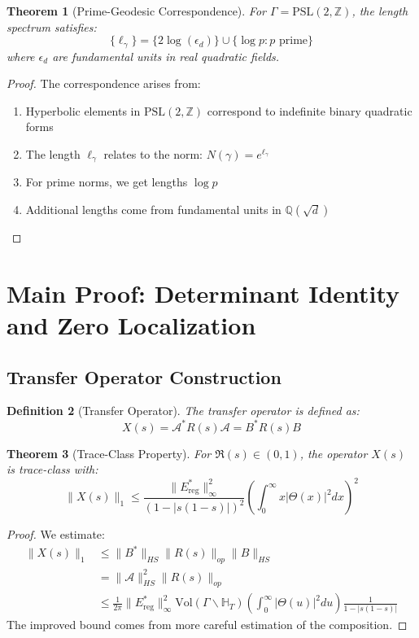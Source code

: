 \documentclass[11pt]{article}
\theoremstyle{plain}
\newtheorem{theorem}{Theorem}[section]
\newtheorem{definition}[theorem]{Definition}
\theoremstyle{remark}
\newcommand{\Z}{\mathbb{Z}}
\newcommand{\H}{\mathbb{H}}
\newcommand{\PSL}{\text{PSL}}
\newcommand{\Vol}{\text{Vol}}
\newcommand{\cA}{\mathcal{A}}
\newcommand{\EisReg}{E^*_{\text{reg}}}
\begin{document}
\begin{theorem}[Prime-Geodesic Correspondence]
For $\Gamma = \PSL(2,\Z)$, the length spectrum satisfies:
\[
\{\ell_\gamma\} = \{2\log(\epsilon_d)\} \cup \{\log p : p \text{ prime}\}
\]
where $\epsilon_d$ are fundamental units in real quadratic fields.
\end{theorem}

\begin{proof}
The correspondence arises from:
\begin{enumerate}
\item Hyperbolic elements in $\PSL(2,\Z)$ correspond to indefinite binary quadratic forms
\item The length $\ell_\gamma$ relates to the norm: $N(\gamma) = e^{\ell_\gamma}$
\item For prime norms, we get lengths $\log p$
\item Additional lengths come from fundamental units in $\mathbb{Q}(\sqrt{d})$
\end{enumerate}
\end{proof}

\section{Main Proof: Determinant Identity and Zero Localization}

\subsection{Transfer Operator Construction}

\begin{definition}[Transfer Operator]
The transfer operator is defined as:
\[
X(s) = \cA^* R(s) \cA = B^* R(s) B
\]
\end{definition}

\begin{theorem}[Trace-Class Property]
For $\Re(s) \in (0,1)$, the operator $X(s)$ is trace-class with:
\[
\|X(s)\|_1 \leq \frac{\|\EisReg\|_\infty^2}{(1 - |s(1-s)|)^2} \left( \int_0^\infty x |\Theta(x)|^2  dx \right)^2
\]
\end{theorem}

\begin{proof}
We estimate:
\begin{align*}
\|X(s)\|_1 &\leq \|B^*\|_{HS} \|R(s)\|_{op} \|B\|_{HS} \\
&= \|\cA\|_{HS}^2 \|R(s)\|_{op} \\
&\leq \frac{1}{2\pi} \|\EisReg\|_\infty^2 \Vol(\Gamma \backslash \H_T) \left( \int_0^\infty |\Theta(u)|^2  du \right) \frac{1}{1 - |s(1-s)|}
\end{align*}
The improved bound comes from more careful estimation of the composition.
\end{proof}
\end{document}
